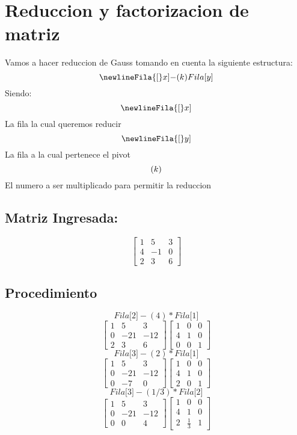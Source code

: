 \documentclass{article}%
\begin{document}
%
\normalsize%
\[%
%
\]%
\section{Reduccion y factorizacion de matriz}%
\label{sec:Reduccionyfactorizaciondematriz}%
Vamos a hacer reduccion de Gauss tomando en cuenta la siguiente estructura:%
\[%
\newline%
Fila{[}x{]}{-}(k)Fila{[}y{]}%
\]%
Siendo:%
\[%
\newline%
Fila{[}x{]}%
\]%
La fila la cual queremos reducir%
\[%
\newline%
Fila{[}y{]}%
\]%
La fila a la cual pertenece el pivot\newline%
%
\[%
\newline%
(k)%
\]%
El numero a ser multiplicado para permitir la reduccion\newline%
%
\subsection{Matriz Ingresada: }%
\label{subsec:MatrizIngresada}%
\[%
\left[\begin{matrix}1 & 5 & 3\\4 & -1 & 0\\2 & 3 & 6\end{matrix}\right]%
\]

%
\subsection{Procedimiento}%
\label{subsec:Procedimiento}%
\[%
Fila{[}2{]}{-}(4)*Fila{[}1{]}%
\]%
\[%
\left[\begin{matrix}1 & 5 & 3\\0 & -21 & -12\\2 & 3 & 6\end{matrix}\right] \left[\begin{matrix}1 & 0 & 0\\4 & 1 & 0\\0 & 0 & 1\end{matrix}\right]%
\]%
\[%
Fila{[}3{]}{-}(2)*Fila{[}1{]}%
\]%
\[%
\left[\begin{matrix}1 & 5 & 3\\0 & -21 & -12\\0 & -7 & 0\end{matrix}\right] \left[\begin{matrix}1 & 0 & 0\\4 & 1 & 0\\2 & 0 & 1\end{matrix}\right]%
\]%
\[%
Fila{[}3{]}{-}(1/3)*Fila{[}2{]}%
\]%
\[%
\left[\begin{matrix}1 & 5 & 3\\0 & -21 & -12\\0 & 0 & 4\end{matrix}\right] \left[\begin{matrix}1 & 0 & 0\\4 & 1 & 0\\2 & \frac{1}{3} & 1\end{matrix}\right]%
\]

%
\end{document}
